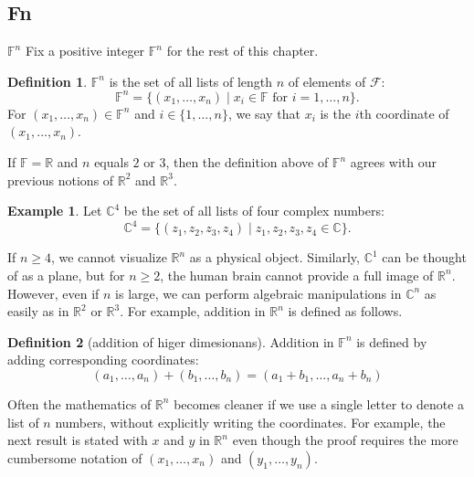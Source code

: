 \documentclass[
]{book}
\theoremstyle{definition}
\newtheorem{definition}{Definition}[chapter]
\theoremstyle{definition}
\newtheorem{example}{Example}[chapter]
\theoremstyle{definition}
\theoremstyle{definition}
\theoremstyle{remark}
\begin{document}
\subsection{Fn}\label{fn}

\(\mathbb{F}^n\)
Fix a positive integer \(\mathbb{F}^n\) for the rest of this chapter.

\begin{definition}
\protect\hypertarget{def:unnamed-chunk-9}{}\label{def:unnamed-chunk-9}\(\mathbb{F}^n\) is the set of all lists of length \(n\) of elements of \(\mathcal{F}\):
\[\mathbb{F}^n = \{(x_1, \ldots, x_n) \mid x_i \in \mathbb{F} \text{ for } i = 1, \ldots, n\}.\]
For \((x_1, \ldots, x_n) \in \mathbb{F}^n\) and \(i \in \{1, \ldots, n\}\), we say that \(x_i\) is the \(i\)th coordinate of \((x_1, \ldots, x_n)\).
\end{definition}

If \(\mathbb{F}=\mathbb{R}\) and \(n\) equals \(2\) or \(3\), then the definition above of \(\mathbb{F}^n\) agrees with our previous notions of \(\mathbb{R}^2\) and \(\mathbb{R}^3\).

\begin{example}
\protect\hypertarget{exm:unnamed-chunk-10}{}\label{exm:unnamed-chunk-10}Let \(\mathbb{C}^4\) be the set of all lists of four complex numbers:
\[\mathbb{C}^4 = \{(z_1, z_2, z_3, z_4) \mid z_1, z_2, z_3, z_4 \in \mathbb{C}\}.\]
\end{example}

If \(n \geq 4\), we cannot visualize \(\mathbb{R}^n\) as a physical object. Similarly, \(\mathbb{C}^1\) can be thought of as a plane, but for \(n \geq 2\), the human brain cannot provide a full image of \(\mathbb{R}^n\). However, even if \(n\) is large, we can perform algebraic manipulations in \(\mathbb{C}^n\) as easily as in \(\mathbb{R}^2\) or \(\mathbb{R}^3\). For example, addition in \(\mathbb{R}^n\) is defined as follows.

\begin{definition}[addition of higer dimesionans]
\protect\hypertarget{def:unnamed-chunk-11}{}\label{def:unnamed-chunk-11}Addition in \(\mathbb{F}^n\) is defined by adding corresponding coordinates:\[
(a_1, …, a_n) + (b_1, …, b_n) = (a_1 + b_1, …, a_n + b_n)
\]
\end{definition}

Often the mathematics of \(\mathbb{R}^n\) becomes cleaner if we use a single letter to denote a list of \(n\) numbers, without explicitly writing the coordinates. For example, the next result is stated with \(x\) and \(y\) in \(\mathbb{R}^n\) even though the proof requires the more cumbersome notation of \((x_1, \ldots, x_n)\) and \((y_1, \ldots, y_n)\).
\end{document}
